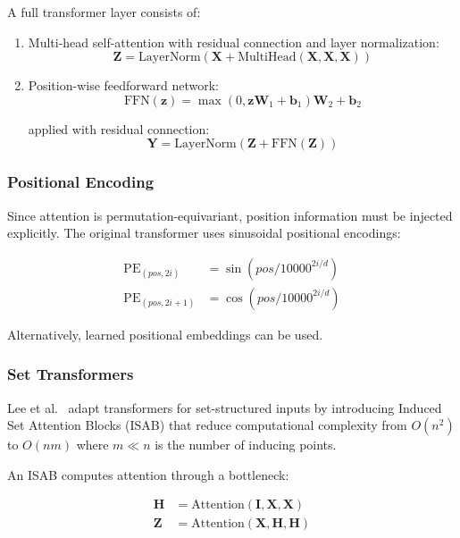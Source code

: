 A full transformer layer consists of:

\begin{enumerate}
\item Multi-head self-attention with residual connection and layer normalization:
\begin{equation}
\mathbf{Z} = \text{LayerNorm}(\mathbf{X} + \text{MultiHead}(\mathbf{X}, \mathbf{X}, \mathbf{X}))
\end{equation}

\item Position-wise feedforward network:
\begin{equation}
\text{FFN}(\mathbf{z}) = \max(0, \mathbf{z}\mathbf{W}_1 + \mathbf{b}_1)\mathbf{W}_2 + \mathbf{b}_2
\end{equation}

applied with residual connection:
\begin{equation}
\mathbf{Y} = \text{LayerNorm}(\mathbf{Z} + \text{FFN}(\mathbf{Z}))
\end{equation}
\end{enumerate}

\subsubsection{Positional Encoding}

Since attention is permutation-equivariant, position information must be injected explicitly. The original transformer uses sinusoidal positional encodings:

\begin{align}
\text{PE}_{(pos, 2i)} &= \sin(pos / 10000^{2i/d}) \\
\text{PE}_{(pos, 2i+1)} &= \cos(pos / 10000^{2i/d})
\end{align}

Alternatively, learned positional embeddings can be used.

\subsubsection{Set Transformers}

Lee et al.~\cite{lee2019set} adapt transformers for set-structured inputs by introducing Induced Set Attention Blocks (ISAB) that reduce computational complexity from $O(n^2)$ to $O(nm)$ where $m \ll n$ is the number of inducing points.

An ISAB computes attention through a bottleneck:

\begin{align}
\mathbf{H} &= \text{Attention}(\mathbf{I}, \mathbf{X}, \mathbf{X}) \\
\mathbf{Z} &= \text{Attention}(\mathbf{X}, \mathbf{H}, \mathbf{H})
\end{align}

